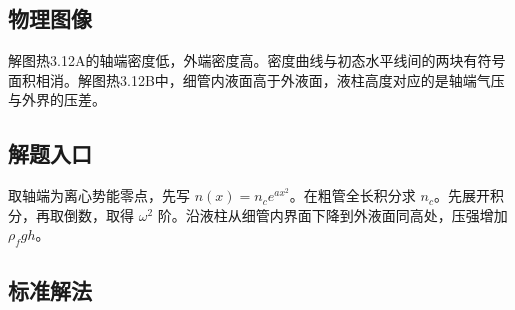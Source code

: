 \documentclass[UTF8,fontset=fandol,a4paper,11pt]{ctexart}
\begin{document}


\subsection*{物理图像}

解图热3.12A的轴端密度低，外端密度高。密度曲线与初态水平线间的两块有符号面积相消。解图热3.12B中，细管内液面高于外液面，液柱高度对应的是轴端气压与外界的压差。



\subsection*{解题入口}

取轴端为离心势能零点，先写 $n(x)=n_c e^{ax^2}$。在粗管全长积分求 $n_c$。先展开积分，再取倒数，取得 $\omega^2$ 阶。沿液柱从细管内界面下降到外液面同高处，压强增加 $\rho_fgh$。




\subsection*{标准解法}
\end{document}
